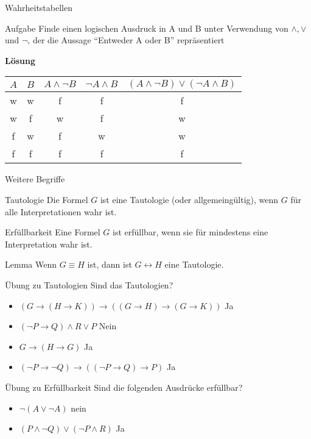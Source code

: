 \begin{frame}{Wahrheitstabellen}
	
	\begin{taskblock}{Aufgabe}
		Finde einen logischen Ausdruck in A und B unter Verwendung von $\land, \lor$ und $\lnot$, der die Aussage ``Entweder A oder B'' repräsentiert	
	\end{taskblock}

	\textbf{Lösung}
	\begin{center}
		\begin{tabular}{|c|c|c|c|c|}
			\hline
			$A$&$B$& $A \land \lnot B$& $\lnot A \land B$ & $(A \land \lnot B) \lor (\lnot A \land B) $\\
			\hline
			w&w&f&f&f\\
			w&f&w&f&w\\
			f&w&f&w&w\\
			f&f&f&f&f\\
			\hline
		\end{tabular}
	\end{center}
\end{frame}


\begin{frame}{Weitere Begriffe}\pause
	\begin{block}{Tautologie}\pause
		Die Formel $G$ ist eine Tautologie (oder allgemeingültig)\pause , wenn $G$ für alle Interpretationen wahr ist.
	\end{block}\pause
	\begin{block}{Erfüllbarkeit}\pause
		Eine Formel $G$ ist erfüllbar\pause , wenn sie für mindestens eine Interpretation wahr ist.
	\end{block}
	\pause
	\begin{block}{Lemma}
		Wenn $G\equiv H$ ist, dann ist $G \leftrightarrow H$ eine Tautologie.
	\end{block}
\end{frame}

\begin{frame} {Übung zu Tautologien}
Sind das Tautologien?
\begin{itemize}
	\item $(G \rightarrow (H \rightarrow K)) \rightarrow ((G \rightarrow H) \rightarrow (G \rightarrow K))$ \pause \hspace{0.3cm} Ja
	\item $(\lnot P \rightarrow Q) \land R \lor P$ \pause \hspace{0.3cm} Nein
	\item $G \rightarrow (H \rightarrow G)$ \pause \hspace{0.3cm} Ja
	\item $(\lnot P \rightarrow \lnot Q) \rightarrow ((\lnot P \rightarrow Q) \rightarrow P)$ \pause \hspace{0.3cm} Ja
\end{itemize}
\end{frame}


\begin{frame} {Übung zu Erfüllbarkeit}
	Sind die folgenden Ausdrücke erfüllbar?
	\begin{itemize}
		\item $ \lnot (A \lor \lnot A) $ \pause \hspace{0.3cm} nein
		\item $(P \land \lnot Q) \lor (\lnot P \land R)$ \pause \hspace{0.3cm} Ja
		
	\end{itemize}
\end{frame}

